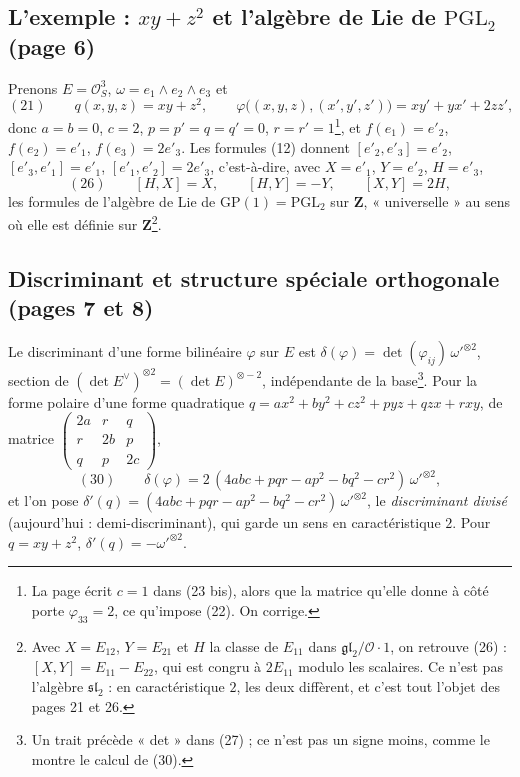\documentclass[11pt,a4paper]{article}
\begin{document}
\subsection*{L'exemple : $xy + z^2$ et l'algèbre de Lie de $\mathrm{PGL}_2$ (page 6)}

Prenons $E = \mathcal{O}_S^3$, $\omega = e_1 \wedge e_2 \wedge e_3$ et
\[
  (21) \qquad q(x, y, z) = xy + z^2 , \qquad
  \varphi\bigl((x, y, z), (x', y', z')\bigr) = xy' + yx' + 2zz' ,
\]
donc $a = b = 0$, $c = 2$, $p = p' = q = q' = 0$, $r = r' = 1$\footnote{La page
écrit $c = 1$ dans (23 bis), alors que la matrice qu'elle donne à côté porte
$\varphi_{33} = 2$, ce qu'impose (22). On corrige.}, et $f(e_1) = e'_2$,
$f(e_2) = e'_1$, $f(e_3) = 2e'_3$. Les formules (12) donnent
$[e'_2, e'_3] = e'_2$, $[e'_3, e'_1] = e'_1$, $[e'_1, e'_2] = 2e'_3$, c'est-à-dire,
avec $X = e'_1$, $Y = e'_2$, $H = e'_3$,
\[
  (26) \qquad [H, X] = X , \qquad [H, Y] = -Y , \qquad [X, Y] = 2H ,
\]
les formules de l'algèbre de Lie de $\mathrm{GP}(1) = \mathrm{PGL}_2$ sur $\mathbf{Z}$,
« universelle » au sens où elle est définie sur $\mathbf{Z}$\footnote{Avec
$X = E_{12}$, $Y = E_{21}$ et $H$ la classe de $E_{11}$ dans
$\mathfrak{gl}_2/\mathcal{O}\cdot 1$, on retrouve (26) : $[X, Y] = E_{11} - E_{22}$, qui est
congru à $2E_{11}$ modulo les scalaires. Ce n'est pas l'algèbre
$\mathfrak{sl}_2$ : en caractéristique $2$, les deux diffèrent, et c'est tout
l'objet des pages 21 et 26.}.

\subsection*{Discriminant et structure spéciale orthogonale (pages 7 et 8)}

Le discriminant d'une forme bilinéaire $\varphi$ sur $E$ est
$\delta(\varphi) = \det(\varphi_{ij})\, \omega'^{\otimes 2}$, section de
$(\det E^{\vee})^{\otimes 2} = (\det E)^{\otimes -2}$, indépendante de la base\footnote{Un
trait précède « det » dans (27) ; ce n'est pas un signe moins, comme le montre
le calcul de (30).}. Pour la forme polaire d'une forme quadratique
$q = ax^2 + by^2 + cz^2 + pyz + qzx + rxy$, de matrice
$\begin{pmatrix} 2a & r & q \\ r & 2b & p \\ q & p & 2c \end{pmatrix}$,
\[
  (30) \qquad \delta(\varphi) = 2\,(4abc + pqr - ap^2 - bq^2 - cr^2)\, \omega'^{\otimes 2} ,
\]
et l'on pose $\delta'(q) = (4abc + pqr - ap^2 - bq^2 - cr^2)\, \omega'^{\otimes 2}$, le
\emph{discriminant divisé} (aujourd'hui : demi-discriminant), qui garde un sens
en caractéristique $2$. Pour $q = xy + z^2$, $\delta'(q) = -\omega'^{\otimes 2}$.
\end{document}
